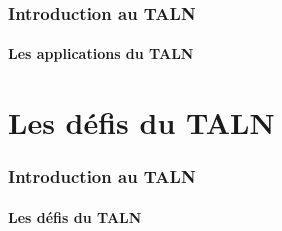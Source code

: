 \documentclass[xcolor=table]{beamer}
\begin{document}
\begin{frame}
\frametitle{Introduction au TALN}
\framesubtitle{Les applications du TALN}

\end{frame}

\section{Les défis du TALN}

\begin{frame}
\frametitle{Introduction au TALN}
\framesubtitle{Les défis du TALN}

\end{frame}



\end{document}
